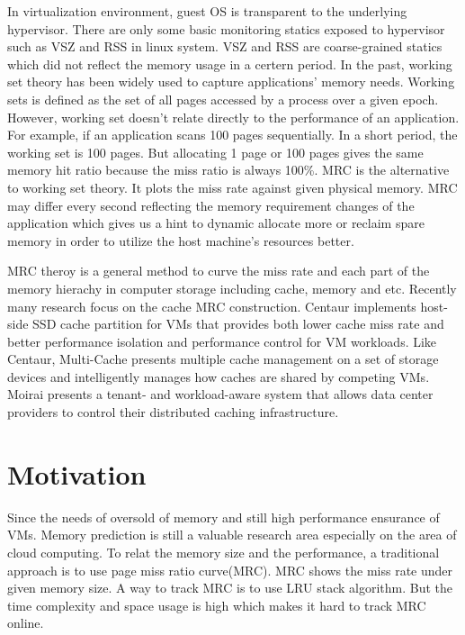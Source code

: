 \documentclass[10pt,twocolumn]{article}
\begin{document}
In virtualization environment, guest OS is transparent to the underlying hypervisor. There are only some basic monitoring statics exposed to hypervisor such as VSZ and RSS in linux system. VSZ and RSS are coarse-grained statics which did not reflect the memory usage in a certern period. In the past, working set theory\cite{wss} has been widely used to capture applications' memory needs. Working sets is defined as the set of all pages accessed by a process over a given epoch. However, working set doesn't relate directly to the performance of an application. For example, if an application scans 100 pages sequentially. In a short period, the working set is 100 pages. But allocating 1 page or 100 pages gives the same memory hit ratio because the miss ratio is always 100\%. MRC is the alternative to working set theory. It plots the miss rate against given physical memory. MRC may differ every second reflecting the memory requirement changes of the application which gives us a hint to dynamic allocate more or reclaim spare memory in order to utilize the host machine's resources better.

MRC theroy is a general method to curve the miss rate and each part of the memory hierachy in computer storage including cache, memory and etc. Recently many research focus on the cache MRC construction. Centaur\cite{Koller2015Centaur} implements host-side SSD cache partition for VMs that provides both lower cache miss rate and better performance isolation and performance control for VM workloads. Like Centaur, Multi-Cache\cite{Rajasekaran2016Multi} presents multiple cache management on a set of storage devices and intelligently manages how caches are shared by competing VMs. Moirai\cite{Stefanovici2015Software} presents a tenant- and workload-aware system that allows data center providers to control their distributed caching infrastructure. 



\section{Motivation}
Since the needs of oversold of memory and still high performance ensurance of VMs. Memory prediction is still a valuable research area especially on the area of cloud computing. To relat the memory size and the performance, a traditional approach is to use page miss ratio curve(MRC). MRC shows the miss rate under given memory size. A way to track MRC is to use LRU stack algorithm\cite{Mattson1970Evaluation}. But the time complexity and space usage is high which makes it hard to track MRC online.
\end{document}
